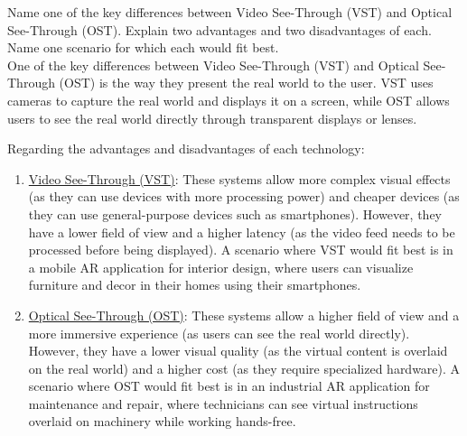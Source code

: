 \begin{ejercicio}
    Name one of the key differences between Video See-Through (VST) and Optical See-Through (OST). Explain two advantages and two disadvantages of each. Name one scenario for which each would fit best.\\

    One of the key differences between Video See-Through (VST) and Optical See-Through (OST) is the way they present the real world to the user. VST uses cameras to capture the real world and displays it on a screen, while OST allows users to see the real world directly through transparent displays or lenses.

    Regarding the advantages and disadvantages of each technology:
    \begin{enumerate}
        \item \ul{Video See-Through (VST)}: These systems allow more complex visual effects (as they can use devices with more processing power) and cheaper devices (as they can use general-purpose devices such as smartphones). However, they have a lower field of view and a higher latency (as the video feed needs to be processed before being displayed). A scenario where VST would fit best is in a mobile AR application for interior design, where users can visualize furniture and decor in their homes using their smartphones.
        \item \ul{Optical See-Through (OST)}: These systems allow a higher field of view and a more immersive experience (as users can see the real world directly). However, they have a lower visual quality (as the virtual content is overlaid on the real world) and a higher cost (as they require specialized hardware). A scenario where OST would fit best is in an industrial AR application for maintenance and repair, where technicians can see virtual instructions overlaid on machinery while working hands-free.
    \end{enumerate}
\end{ejercicio}

